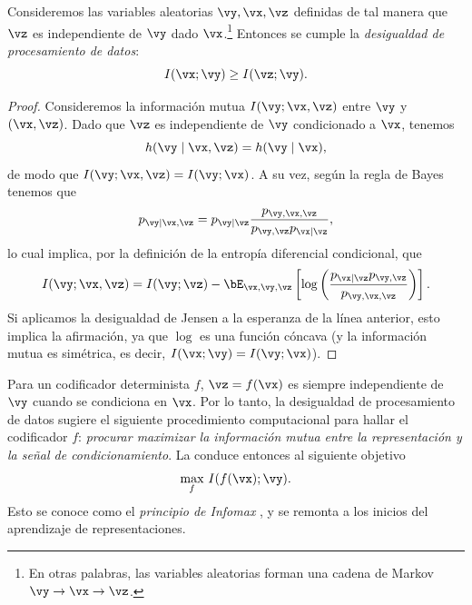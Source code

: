 \documentclass[../../book-main_es.tex]{subfiles}
\begin{document}
\begin{theorem}\label{thm:dpi}
    Consideremos las variables aleatorias $\vy, \vx, \vz$ definidas de tal manera que $\vz$ es
    independiente de $\vy$ dado $\vx$.\footnote{En otras palabras, las
    variables aleatorias forman una cadena de Markov $\vy \to \vx \to \vz$.} Entonces se cumple la
    \textit{desigualdad de procesamiento de datos}:
    \begin{equation}\label{eq:dpi-ch7}
        I(\vx; \vy) \geq I(\vz; \vy).
    \end{equation}
    \begin{proof}
        Consideremos la información mutua $I(\vy; \vx, \vz)$ entre $\vy$ y
        $(\vx, \vz)$. Dado que $\vz$ es independiente de $\vy$ condicionado a
        $\vx$, tenemos
        \begin{equation*}
            h(\vy \mid \vx, \vz) = h(\vy \mid \vx),
        \end{equation*}
        de modo que $I(\vy; \vx, \vz) = I(\vy; \vx)$. A su vez, según la regla de Bayes
        tenemos que
        \begin{equation*}
            p_{\vy \mid \vx, \vz} = p_{\vy \mid \vz}
            \frac{p_{\vy, \vx, \vz}}{p_{\vy, \vz} p_{\vx \mid \vz}},
        \end{equation*}
        lo cual implica, por la definición de la entropía diferencial condicional, que
        \begin{equation*}
            I(\vy; \vx, \vz) =
            I(\vy; \vz)
            - \bE_{\vx, \vy, \vz}\left[ \log \left(
                    \frac{p_{\vx \mid \vz} p_{\vy, \vz}}{p_{\vy, \vx, \vz}}
            \right)\right].
        \end{equation*}
        Si aplicamos la desigualdad de Jensen a la esperanza de la línea anterior,
        esto implica la afirmación, ya que $\log$ es una función cóncava (y la
        información mutua es simétrica, es decir, $I(\vx; \vy) = I(\vy; \vx)$).
    \end{proof}
\end{theorem}

Para un codificador determinista $f$, $\vz = f(\vx)$ es siempre independiente de $\vy$
cuando se condiciona en $\vx$.
Por lo tanto, la desigualdad de procesamiento de datos sugiere el siguiente procedimiento computacional
para hallar el codificador $f$: \textit{procurar maximizar la información mutua
entre la representación y la señal de condicionamiento}.
La  conduce entonces al siguiente objetivo
\begin{equation}\label{eq:infomax-x}
    \max_{f}\, I(f(\vx); \vy).
\end{equation}
Esto se conoce como el \textit{principio de Infomax} \cite{infomax}, y
se remonta a los inicios del aprendizaje de representaciones.
\end{document}

